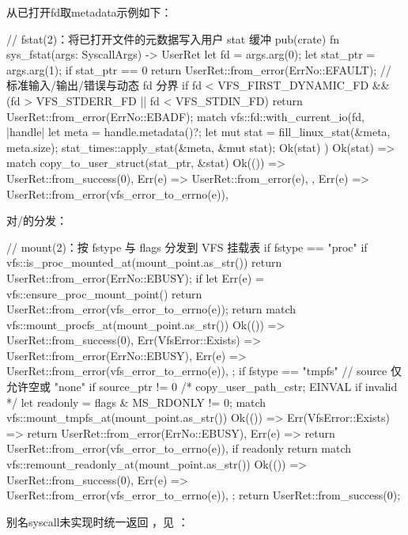 从已打开fd取metadata示例如下：

\begin{rustcode}
// fstat(2)：将已打开文件的元数据写入用户 stat 缓冲
pub(crate) fn sys_fstat(args: SyscallArgs) -> UserRet {
    let fd = args.arg(0);
    let stat_ptr = args.arg(1);
    if stat_ptr == 0 {
        return UserRet::from_error(ErrNo::EFAULT);
    }
    // 标准输入/输出/错误与动态 fd 分界
    if fd < VFS_FIRST_DYNAMIC_FD && (fd > VFS_STDERR_FD || fd < VFS_STDIN_FD) {
        return UserRet::from_error(ErrNo::EBADF);
    }
    match vfs::fd::with_current_io(fd, |handle| {
        let meta = handle.metadata()?;
        let mut stat = fill_linux_stat(&meta, meta.size);
        stat_times::apply_stat(&meta, &mut stat);
        Ok(stat)
    }) {
        Ok(stat) => match copy_to_user_struct(stat_ptr, &stat) {
            Ok(()) => UserRet::from_success(0),
            Err(e) => UserRet::from_error(e),
        },
        Err(e) => UserRet::from_error(vfs_error_to_errno(e)),
    }
}
\end{rustcode}

对/的分发：

\begin{rustcode}
// mount(2)：按 fstype 与 flags 分发到 VFS 挂载表
if fstype == "proc" {
    if vfs::is_proc_mounted_at(mount_point.as_str()) {
        return UserRet::from_error(ErrNo::EBUSY);
    }
    if let Err(e) = vfs::ensure_proc_mount_point() {
        return UserRet::from_error(vfs_error_to_errno(e));
    }
    return match vfs::mount_procfs_at(mount_point.as_str()) {
        Ok(()) => UserRet::from_success(0),
        Err(VfsError::Exists) => UserRet::from_error(ErrNo::EBUSY),
        Err(e) => UserRet::from_error(vfs_error_to_errno(e)),
    };
}
if fstype == "tmpfs" {
    // source 仅允许空或 "none"
    if source_ptr != 0 { /* copy_user_path_cstr; EINVAL if invalid */ }
    let readonly = flags & MS_RDONLY != 0;
    match vfs::mount_tmpfs_at(mount_point.as_str()) {
        Ok(()) => {}
        Err(VfsError::Exists) => return UserRet::from_error(ErrNo::EBUSY),
        Err(e) => return UserRet::from_error(vfs_error_to_errno(e)),
    }
    if readonly {
        return match vfs::remount_readonly_at(mount_point.as_str()) {
            Ok(()) => UserRet::from_success(0),
            Err(e) => UserRet::from_error(vfs_error_to_errno(e)),
        };
    }
    return UserRet::from_success(0);
}
\end{rustcode}

别名syscall未实现时统一返回 ，见 ：

